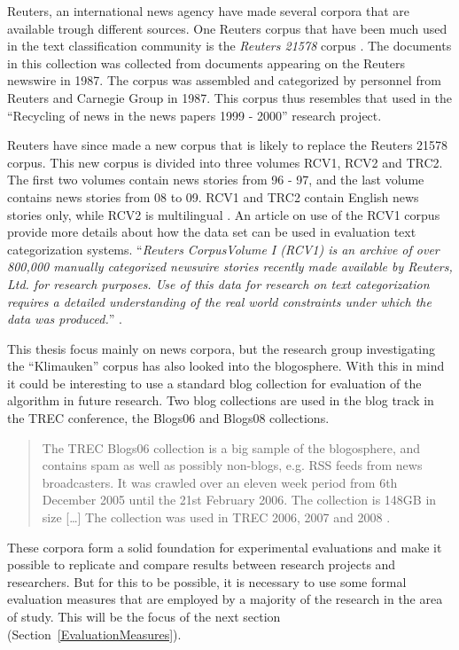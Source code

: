 Reuters, an international news agency have made several corpora that are available trough different sources. One Reuters corpus that have been much used in the text classification community is the \textit{Reuters 21578} corpus \cite{Lewis2004a}. The documents in this collection was collected from documents appearing on the Reuters newswire in 1987. The corpus was assembled and categorized by personnel from Reuters and Carnegie Group in 1987. This corpus thus resembles that used in the ``Recycling of news in the news papers 1999 - 2000'' research project.

Reuters have since made a new corpus that is likely to replace the Reuters 21578 corpus. This new corpus is divided into three volumes RCV1, RCV2 and TRC2. The first two volumes contain news stories from 96 - 97, and the last volume contains news stories from 08 to 09. RCV1 and TRC2 contain English news stories only, while RCV2 is multilingual \cite{NationalInstituteofStandardsandTechnology2004}. An article on use of the RCV1 corpus provide more details about how the data set can be used in evaluation text categorization systems. ``\textit{Reuters CorpusVolume I (RCV1) is an archive of over 800,000 manually categorized newswire stories recently made available by Reuters, Ltd. for research purposes. Use of this data for research on text categorization requires a detailed understanding of the real world constraints under which the data was produced.}'' \cite{Lewis2004}. 

This thesis focus mainly on news corpora, but the research group investigating the ``Klimauken'' corpus has also looked into the blogosphere. With this in mind it could be interesting to use a standard blog collection for evaluation of the algorithm in future research. Two blog collections are used in the blog track in the TREC conference, the Blogs06 and Blogs08 collections.\begin{quote}
The TREC Blogs06 collection is a big sample of the blogosphere, and contains spam as well as possibly non-blogs, e.g. RSS feeds from news broadcasters. It was crawled over an eleven week period from 6th December 2005 until the 21st February 2006. The collection is 148GB in size [\dots] The collection was used in TREC 2006, 2007 and 2008 \cite{Macdonald2011}.
\end{quote} 

These corpora form a solid foundation for experimental evaluations and make it possible to replicate and compare results between research projects and researchers. But for this to be possible, it is necessary to use some formal evaluation measures that are employed by a majority of the research in the area of study. This will be the focus of the next section (Section~\ref{EvaluationMeasures}).

